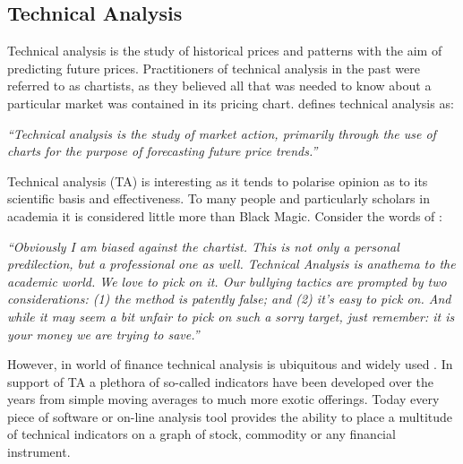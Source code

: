 \subsection{Technical Analysis}
\label{chp1:ta}
Technical analysis is the study of historical prices and patterns with the aim of predicting future prices. Practitioners of technical analysis in the past were referred to as chartists, as they believed all that was needed to know about a particular market was contained in its pricing chart. \cite{murphy1999technical} defines technical analysis as:


\textit{\textquotedblleft Technical analysis is the study of market action, primarily through the use of charts for the purpose of forecasting future price trends.\textquotedblright}

Technical analysis (TA) is interesting as it tends to polarise opinion as to its scientific basis and effectiveness. To many people and particularly scholars in academia it is considered little more than Black Magic. Consider the words of \cite{malkiel1999random}:

\textit{\textquotedblleft Obviously I am biased against the chartist. This is not only a personal predilection, but a professional one as well. Technical Analysis is anathema to the academic world. We love to pick on it. Our bullying tactics are prompted by two considerations: (1) the method is patently false; and (2) it's easy to pick on. And while it may seem a bit unfair to pick on such a sorry target, just remember: it is your money we are trying to save.\textquotedblright}

However, in world of finance technical analysis is ubiquitous and widely used \citep{Menkhoff20102573}. In support of TA a plethora of so-called indicators have been developed over the years from simple moving averages to much more exotic offerings. Today every piece of software or on-line analysis tool provides the ability to place a multitude of technical indicators on a graph of stock, commodity or any financial instrument.


